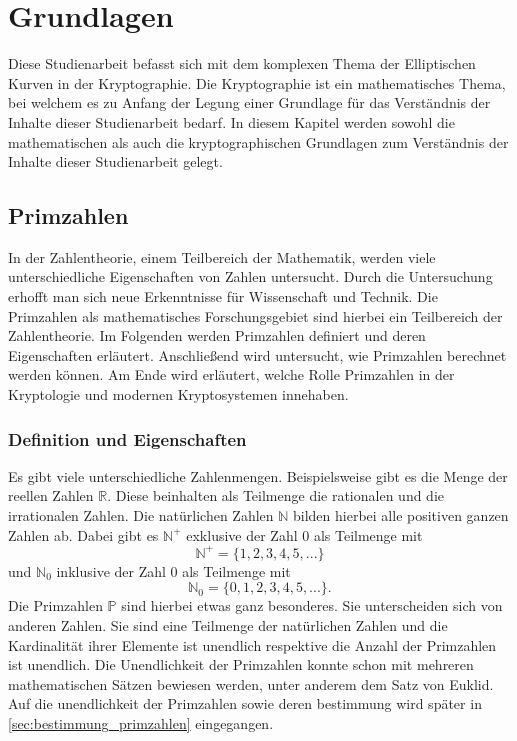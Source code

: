 \chapter{Grundlagen}\label{sec:grundlagen}
Diese Studienarbeit befasst sich mit dem komplexen Thema der Elliptischen Kurven in der Kryptographie. Die Kryptographie ist ein mathematisches Thema, bei welchem es zu Anfang der Legung einer Grundlage für das Verständnis der Inhalte dieser Studienarbeit bedarf. In diesem Kapitel werden sowohl die mathematischen als auch die kryptographischen Grundlagen zum Verständnis der Inhalte dieser Studienarbeit gelegt.

\section{Primzahlen}
In der Zahlentheorie, einem Teilbereich der Mathematik, werden viele unterschiedliche Eigenschaften von Zahlen untersucht. Durch die Untersuchung erhofft man sich neue Erkenntnisse für Wissenschaft und Technik. Die Primzahlen als mathematisches Forschungsgebiet sind hierbei ein Teilbereich der Zahlentheorie. Im Folgenden werden Primzahlen definiert und deren Eigenschaften erläutert. Anschließend wird untersucht, wie Primzahlen berechnet werden können. Am Ende wird erläutert, welche Rolle Primzahlen in der Kryptologie und modernen Kryptosystemen innehaben.

\subsection{Definition und Eigenschaften}
Es gibt viele unterschiedliche Zahlenmengen. Beispielsweise gibt es die Menge der reellen Zahlen $\mathbb{R}$. Diese beinhalten als Teilmenge die rationalen und die irrationalen Zahlen. Die natürlichen Zahlen $\mathbb{N}$ bilden hierbei alle positiven ganzen Zahlen ab. Dabei gibt es $\mathbb{N^{+}}$ exklusive der Zahl 0 als Teilmenge mit \[\mathbb{N^{+}} = \{1, 2, 3, 4, 5, ...\}\] und $\mathbb{N}_0$ inklusive der Zahl 0 als Teilmenge mit \[\mathbb{N}_0 = \{0, 1, 2, 3, 4, 5, ...\}.\] Die Primzahlen $\mathbb{P}$ sind hierbei etwas ganz besonderes. Sie unterscheiden sich von anderen Zahlen. Sie sind eine Teilmenge der natürlichen Zahlen und die Kardinalität ihrer Elemente ist unendlich respektive die Anzahl der Primzahlen ist unendlich. Die Unendlichkeit der Primzahlen konnte schon mit mehreren mathematischen Sätzen bewiesen werden, unter anderem dem Satz von Euklid. Auf die unendlichkeit der Primzahlen sowie deren bestimmung wird später in \ref{sec:bestimmung_primzahlen} eingegangen.\\

